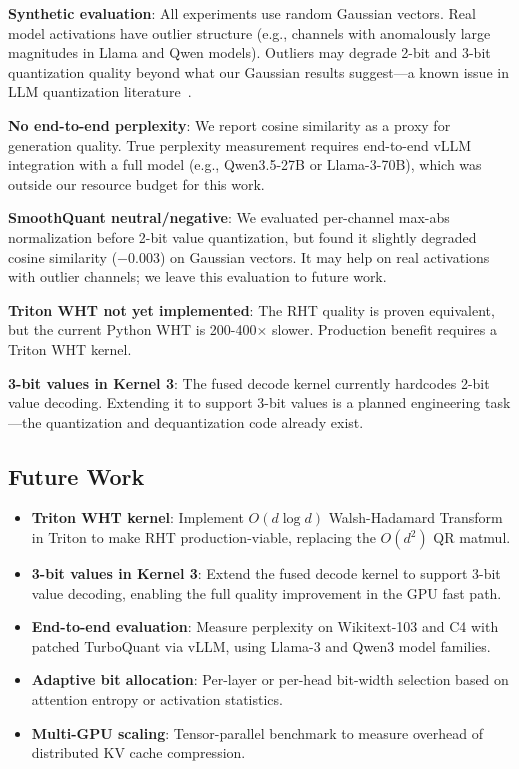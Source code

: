 \documentclass[10pt,twocolumn]{article}
\begin{document}
\textbf{Synthetic evaluation}: All experiments use random Gaussian vectors. Real model activations have outlier structure (e.g., channels with anomalously large magnitudes in Llama and Qwen models). Outliers may degrade 2-bit and 3-bit quantization quality beyond what our Gaussian results suggest—a known issue in LLM quantization literature~\cite{xiao2023smoothquant}.

\textbf{No end-to-end perplexity}: We report cosine similarity as a proxy for generation quality. True perplexity measurement requires end-to-end vLLM integration with a full model (e.g., Qwen3.5-27B or Llama-3-70B), which was outside our resource budget for this work.

\textbf{SmoothQuant neutral/negative}: We evaluated per-channel max-abs normalization before 2-bit value quantization, but found it slightly degraded cosine similarity ($-0.003$) on Gaussian vectors. It may help on real activations with outlier channels; we leave this evaluation to future work.

\textbf{Triton WHT not yet implemented}: The RHT quality is proven equivalent, but the current Python WHT is 200-400$\times$ slower. Production benefit requires a Triton WHT kernel.

\textbf{3-bit values in Kernel 3}: The fused decode kernel currently hardcodes 2-bit value decoding. Extending it to support 3-bit values is a planned engineering task—the quantization and dequantization code already exist.

\subsection{Future Work}

\begin{itemize}
\item \textbf{Triton WHT kernel}: Implement $O(d \log d)$ Walsh-Hadamard Transform in Triton to make RHT production-viable, replacing the $O(d^2)$ QR matmul.
\item \textbf{3-bit values in Kernel 3}: Extend the fused decode kernel to support 3-bit value decoding, enabling the full quality improvement in the GPU fast path.
\item \textbf{End-to-end evaluation}: Measure perplexity on Wikitext-103 and C4 with patched TurboQuant via vLLM, using Llama-3 and Qwen3 model families.
\item \textbf{Adaptive bit allocation}: Per-layer or per-head bit-width selection based on attention entropy or activation statistics.
\item \textbf{Multi-GPU scaling}: Tensor-parallel benchmark to measure overhead of distributed KV cache compression.
\end{itemize}
\end{document}
